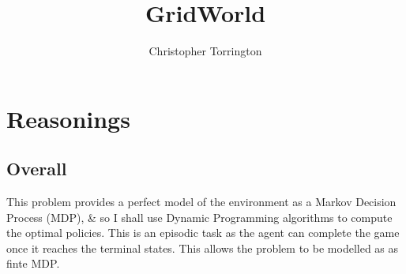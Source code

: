 \documentclass[12pt, a4paper]{article}
\title{GridWorld}
\author{Christopher Torrington}
\begin{document}
\maketitle

\section{Reasonings}
\subsection{Overall}
This problem provides a perfect model of the environment as a Markov
Decision Process (MDP), \& so I shall use Dynamic Programming algorithms to 
compute the optimal policies. This is an episodic task as the agent can 
complete the game once it reaches the terminal states. This allows the problem 
to be modelled as as finte MDP.
\end{document}

